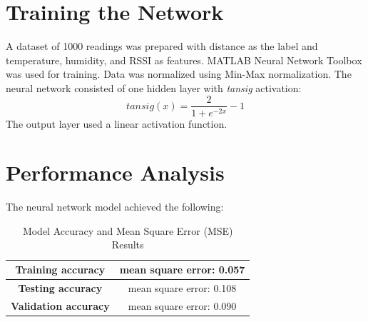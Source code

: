 \documentclass[conference]{IEEEtran}
\begin{document}
\renewcommand{\arraystretch}{1.3} %
\begin{table}[h!]
\centering
\caption{RSSI values in outdoor conditions}
\label{tab:rssi}
\end{table}


\section{Training the Network}
A dataset of 1000 readings was prepared with distance as the label and temperature, humidity, and RSSI as features. MATLAB Neural Network Toolbox \cite{b10} was used for training. Data was normalized using Min-Max normalization. The neural network consisted of one hidden layer with \textit{tansig} activation:
\begin{equation}
tansig(x) = \frac{2}{1 + e^{-2x}} - 1
\end{equation}
The output layer used a linear activation function.

\section{Performance Analysis}
The neural network model achieved the following:
\begin{table}[htbp]
\caption{Model Accuracy and Mean Square Error (MSE) Results}
\centering
\begin{tabular}{|c|c|}
\hline
\textbf{Training accuracy} & mean square error: 0.057 \\
\hline
\textbf{Testing accuracy} & mean square error:  0.108 \\
\hline
\textbf{Validation accuracy} & mean square error:  0.090 \\
\hline
\end{tabular}
\label{tab:accuracy}
\end{table}
\end{document}
